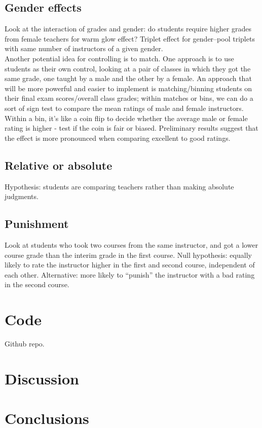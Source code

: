 \documentclass[12pt]{article}
\begin{document}
\subsection{Gender effects}
Look at the interaction of grades and gender: 
do students require higher grades from female teachers for warm glow effect?
Triplet effect for gender--pool triplets with same number of instructors of a given gender. \\

Another potential idea for controlling is to match. One approach is to use students as their own control, looking at a pair of classes in which they got the same grade, one taught by a male and the other by a female. An approach that will be more powerful and easier to implement is matching/binning students on their final exam scores/overall class grades; within matches or bins, we can do a sort of sign test to compare the mean ratings of male and female instructors. Within a bin, it's like a coin flip to decide whether the average male or female rating is higher - test if the coin is fair or biased. Preliminary results suggest that the effect is more pronounced when comparing excellent to good ratings.

\subsection{Relative or absolute}
Hypothesis: students are comparing teachers rather than making absolute judgments.


\subsection{Punishment}
Look at students who took two courses from the same instructor, and got a lower course grade than the interim grade in the first course.
Null hypothesis: equally likely to rate the instructor higher in the first and second course, 
independent of each other.
Alternative: more likely to ``punish'' the instructor with a bad rating in the second course.


\section{Code}
Github repo.

\section{Discussion}

\section{Conclusions}
\end{document}
